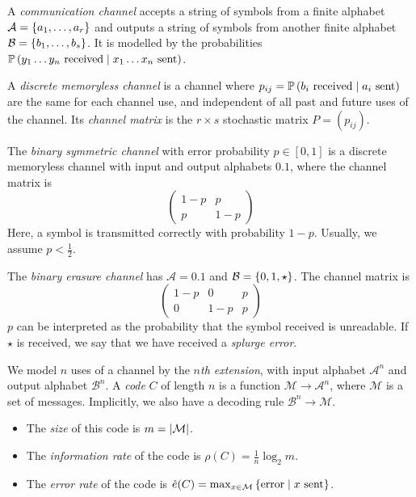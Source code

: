 \begin{definition}
    A \emph{communication channel} accepts a string of symbols from a finite alphabet \( \mathcal A = \qty{a_1, \dots, a_r} \) and outputs a string of symbols from another finite alphabet \( \mathcal B = \qty{b_1, \dots, b_s} \).
    It is modelled by the probabilities \( \mathbb{P}\left({y_1 \dots y_n \text{ received} \mid x_1 \dots x_n \text{ sent}}\right) \).
\end{definition}
\begin{definition}
    A \emph{discrete memoryless channel} is a channel where \( p_{ij} = \mathbb{P}\left({b_i \text{ received} \mid a_i \text{ sent}}\right) \) are the same for each channel use, and independent of all past and future uses of the channel.
    Its \emph{channel matrix} is the \( r \times s \) stochastic matrix \( P = (p_{ij}) \).
\end{definition}
\begin{example}
    The \emph{binary symmetric channel} with error probability \( p \in [0,1] \) is a discrete memoryless channel with input and output alphabets \( \qty{0, 1} \), where the channel matrix is
    \[ \begin{pmatrix}
            1-p & p \\
            p & 1-p
    \end{pmatrix} \]
    Here, a symbol is transmitted correctly with probability \( 1 - p \).
    Usually, we assume \( p < \frac{1}{2} \).
\end{example}
\begin{example}
    The \emph{binary erasure channel} has \( \mathcal A = \qty{0, 1} \) and \( \mathcal B = \qty{0, 1, \star} \).
    The channel matrix is
    \[ \begin{pmatrix}
        1-p & 0 & p \\
        0 & 1-p & p
    \end{pmatrix} \]
    \( p \) can be interpreted as the probability that the symbol received is unreadable.
    If \( \star \) is received, we say that we have received a \emph{splurge error}.
\end{example}
\begin{definition}
    We model \( n \) uses of a channel by the \emph{\( n \)th extension}, with input alphabet \( \mathcal A^n \) and output alphabet \( \mathcal B^n \).
    A \emph{code} \( C \) of length \( n \) is a function \( \mathcal M \to \mathcal A^n \), where \( \mathcal M \) is a set of messages.
    Implicitly, we also have a decoding rule \( \mathcal B^n \to \mathcal M \).
    \begin{itemize}
        \item The \emph{size} of this code is \( m = \abs{\mathcal M} \).
        \item The \emph{information rate} of the code is \( \rho(C) = \frac{1}{n} \log_2 m \).
        \item The \emph{error rate} of the code is \( \hat e(C) = \max_{x \in \mathcal M} \qty{\text{error} \mid x \text{ sent}} \).
    \end{itemize}
\end{definition}
